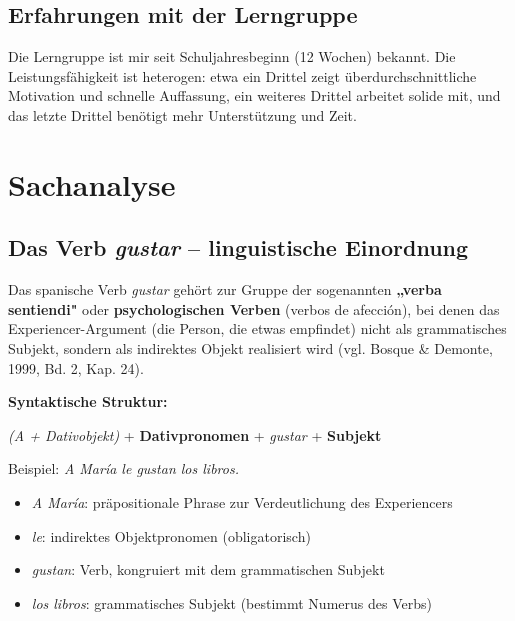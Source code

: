 \documentclass[11pt, a4paper]{article}
\newcommand{\es}[1]{\textcolor{spanisch}{\textit{#1}}}
\begin{document}
\subsection{Erfahrungen mit der Lerngruppe}

Die Lerngruppe ist mir seit Schuljahresbeginn (12 Wochen) bekannt. Die Leistungsfähigkeit ist heterogen: etwa ein Drittel zeigt überdurchschnittliche Motivation und schnelle Auffassung, ein weiteres Drittel arbeitet solide mit, und das letzte Drittel benötigt mehr Unterstützung und Zeit.


\section{Sachanalyse}

\subsection{Das Verb \es{gustar} -- linguistische Einordnung}

Das spanische Verb \es{gustar} gehört zur Gruppe der sogenannten \textbf{„verba sentiendi"} oder \textbf{psychologischen Verben} (verbos de afección), bei denen das Experiencer-Argument (die Person, die etwas empfindet) nicht als grammatisches Subjekt, sondern als indirektes Objekt realisiert wird (vgl. Bosque \& Demonte, 1999, Bd. 2, Kap. 24).

\textbf{Syntaktische Struktur:}
\begin{center}
    \textit{(A + Dativobjekt)} + \textbf{Dativpronomen} + \es{gustar} + \textbf{Subjekt}
\end{center}

Beispiel: \es{A María le gustan los libros.}

\begin{itemize}[leftmargin=2em]
    \item \textit{A María}: präpositionale Phrase zur Verdeutlichung des Experiencers
    \item \textit{le}: indirektes Objektpronomen (obligatorisch)
    \item \textit{gustan}: Verb, kongruiert mit dem grammatischen Subjekt
    \item \textit{los libros}: grammatisches Subjekt (bestimmt Numerus des Verbs)
\end{itemize}
\end{document}
